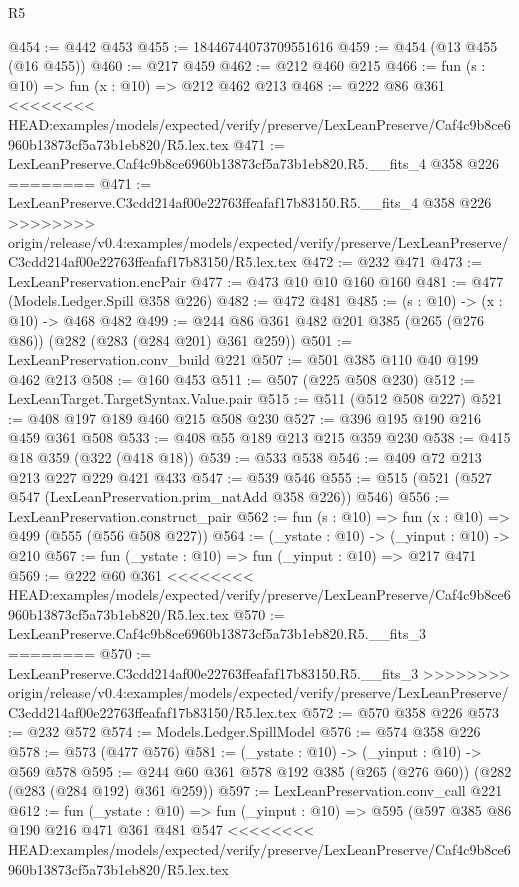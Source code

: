 \begin{lexlean}{R5}
\begin{coremodule}
{{{{{{{{{{{{{@454 := @442 @453
@455 := 18446744073709551616
@459 := @454 (@13 @455 (@16 @455))
@460 := @217 @459
@462 := @212 @460 @215
@466 := fun (s : @10) => fun (x : @10) => @212 @462 @213
@468 := @222 @86 @361
<<<<<<<< HEAD:examples/models/expected/verify/preserve/LexLeanPreserve/Caf4c9b8ce6960b13873cf5a73b1eb820/R5.lex.tex
@471 := LexLeanPreserve.Caf4c9b8ce6960b13873cf5a73b1eb820.R5.__fits_4 @358 @226
========
@471 := LexLeanPreserve.C3cdd214af00e22763ffeafaf17b83150.R5.__fits_4 @358 @226
>>>>>>>> origin/release/v0.4:examples/models/expected/verify/preserve/LexLeanPreserve/C3cdd214af00e22763ffeafaf17b83150/R5.lex.tex
@472 := @232 @471
@473 := LexLeanPreservation.encPair
@477 := @473 @10 @10 @160 @160
@481 := @477 (Models.Ledger.Spill @358 @226)
@482 := @472 @481
@485 := (s : @10) -> (x : @10) -> @468 @482
@499 := @244 @86 @361 @482 @201 @385 (@265 (@276 @86)) (@282 (@283 (@284 @201) @361 @259))
@501 := LexLeanPreservation.conv_build @221
@507 := @501 @385 @110 @40 @199 @462 @213
@508 := @160 @453
@511 := @507 (@225 @508 @230)
@512 := LexLeanTarget.TargetSyntax.Value.pair
@515 := @511 (@512 @508 @227)
@521 := @408 @197 @189 @460 @215 @508 @230
@527 := @396 @195 @190 @216 @459 @361 @508
@533 := @408 @55 @189 @213 @215 @359 @230
@538 := @415 @18 @359 (@322 (@418 @18))
@539 := @533 @538
@546 := @409 @72 @213 @213 @227 @229 @421 @433
@547 := @539 @546
@555 := @515 (@521 (@527 @547 (LexLeanPreservation.prim_natAdd @358 @226)) @546)
@556 := LexLeanPreservation.construct_pair
@562 := fun (s : @10) => fun (x : @10) => @499 (@555 (@556 @508 @227))
@564 := (_ystate : @10) -> (_yinput : @10) -> @210
@567 := fun (_ystate : @10) => fun (_yinput : @10) => @217 @471
@569 := @222 @60 @361
<<<<<<<< HEAD:examples/models/expected/verify/preserve/LexLeanPreserve/Caf4c9b8ce6960b13873cf5a73b1eb820/R5.lex.tex
@570 := LexLeanPreserve.Caf4c9b8ce6960b13873cf5a73b1eb820.R5.__fits_3
========
@570 := LexLeanPreserve.C3cdd214af00e22763ffeafaf17b83150.R5.__fits_3
>>>>>>>> origin/release/v0.4:examples/models/expected/verify/preserve/LexLeanPreserve/C3cdd214af00e22763ffeafaf17b83150/R5.lex.tex
@572 := @570 @358 @226
@573 := @232 @572
@574 := Models.Ledger.SpillModel
@576 := @574 @358 @226
@578 := @573 (@477 @576)
@581 := (_ystate : @10) -> (_yinput : @10) -> @569 @578
@595 := @244 @60 @361 @578 @192 @385 (@265 (@276 @60)) (@282 (@283 (@284 @192) @361 @259))
@597 := LexLeanPreservation.conv_call @221
@612 := fun (_ystate : @10) =>
  fun (_yinput : @10) =>
  @595
    (@597
      @385
      @86
      @190
      @216
      @471
      @361
      @481
      @547
<<<<<<<< HEAD:examples/models/expected/verify/preserve/LexLeanPreserve/Caf4c9b8ce6960b13873cf5a73b1eb820/R5.lex.tex
}}}}}}}}}}}}}
\end{coremodule}
\end{lexlean}
